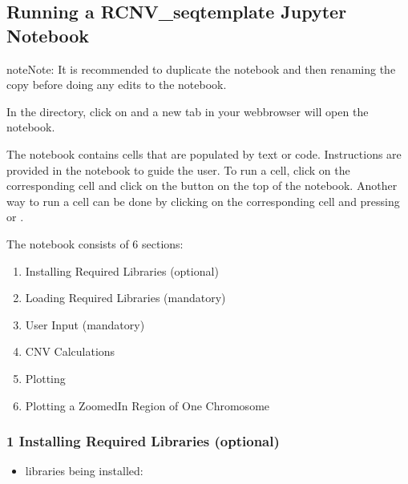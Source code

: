 \documentclass[letterpaper,10pt,english]{sphinxhowto}
\begin{document}
\subsection{Running a RCNV\_seq\sphinxhyphen{}template Jupyter Notebook}
\label{\detokenize{index:running-a-rcnv-seq-template-jupyter-notebook}}
\begin{sphinxadmonition}{note}{Note:}
\sphinxAtStartPar
It is recommended to duplicate the  notebook and then renaming the copy before doing any edits to the notebook.
\end{sphinxadmonition}

\sphinxAtStartPar
In the  directory, click on  and a new tab in your web\sphinxhyphen{}browser will open the notebook.

\sphinxAtStartPar
The notebook contains cells that are populated by text or code. Instructions are provided in the notebook to guide the user. To run a cell, click on the corresponding cell and click on the  button on the top of the notebook. Another way to run a cell can be done by clicking on the corresponding cell and pressing  or .

\sphinxAtStartPar
The notebook consists of 6 sections:
\begin{enumerate}
%
\item {} 
\sphinxAtStartPar
Installing Required Libraries (optional)

\item {} 
\sphinxAtStartPar
Loading Required Libraries (mandatory)

\item {} 
\sphinxAtStartPar
User Input (mandatory)

\item {} 
\sphinxAtStartPar
CNV Calculations

\item {} 
\sphinxAtStartPar
Plotting

\item {} 
\sphinxAtStartPar
Plotting a Zoomed\sphinxhyphen{}In Region of One Chromosome

\end{enumerate}


\subsubsection{1 \sphinxhyphen{} Installing Required Libraries (optional)}
\label{\detokenize{index:installing-required-libraries-optional}}\begin{itemize}
\item {} 
\sphinxAtStartPar
libraries being installed:

\end{itemize}
\end{document}
